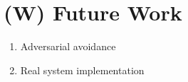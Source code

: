 \section{(W) Future Work}
\begin{enumerate}
	\item Adversarial avoidance
	\item Real system implementation
\end{enumerate}








    


